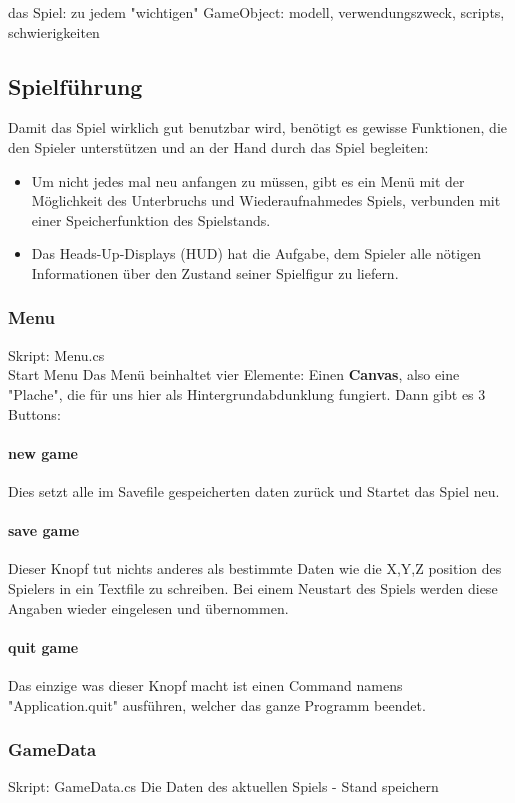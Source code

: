 das Spiel: 
	zu jedem "wichtigen" GameObject:
	modell, verwendungszweck, scripts, 				schwierigkeiten

\subsection{Spielführung}
Damit das Spiel wirklich gut benutzbar wird, benötigt es gewisse Funktionen, die den Spieler unterstützen und an der Hand durch das Spiel begleiten:
\begin{itemize}
\item Um nicht jedes mal neu anfangen zu müssen, gibt es ein Menü mit der Möglichkeit des Unterbruchs und Wiederaufnahmedes Spiels, verbunden mit einer Speicherfunktion des Spielstands.
\item Das Heads-Up-Displays (HUD) hat die Aufgabe, dem Spieler alle nötigen Informationen über den Zustand seiner Spielfigur zu liefern.
\end{itemize}



\subsubsection{Menu}
Skript: Menu.cs\\
Start Menu
Das Menü beinhaltet vier Elemente: Einen \textbf{Canvas}, also eine "Plache", die für uns hier als Hintergrundabdunklung fungiert.
Dann gibt es 3 Buttons:
\paragraph{new game}
Dies setzt alle im Savefile gespeicherten daten zurück und Startet das Spiel neu.

\paragraph{save game}
Dieser Knopf tut nichts anderes als bestimmte Daten wie die X,Y,Z position des Spielers in ein Textfile zu schreiben. Bei einem Neustart des Spiels werden diese Angaben wieder eingelesen und  übernommen.

\paragraph{quit game}
Das einzige was dieser Knopf macht ist einen Command namens "Application.quit" ausführen, welcher das ganze Programm beendet. 

\subsubsection{GameData}
Skript: GameData.cs
Die Daten des aktuellen Spiels
- Stand speichern

